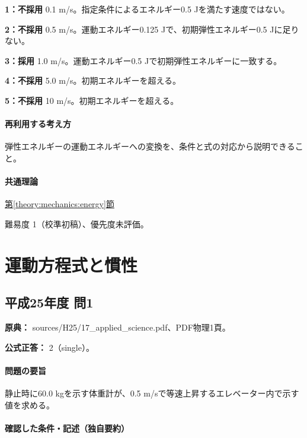 \noindent\textbf{1：不採用} 0.1 m/s。指定条件によるエネルギー0.5 Jを満たす速度ではない。\par

\noindent\textbf{2：不採用} 0.5 m/s。運動エネルギー0.125 Jで、初期弾性エネルギー0.5 Jに足りない。\par

\noindent\textbf{3：採用} 1.0 m/s。運動エネルギー0.5 Jで初期弾性エネルギーに一致する。\par

\noindent\textbf{4：不採用} 5.0 m/s。初期エネルギーを超える。\par

\noindent\textbf{5：不採用} 10 m/s。初期エネルギーを超える。\par

\paragraph{再利用する考え方} 弾性エネルギーの運動エネルギーへの変換を、条件と式の対応から説明できること。

\paragraph{共通理論} \hyperref[theory:mechanics:energy]{第\ref*{theory:mechanics:energy}節}

\par 難易度 1（校準初稿）、優先度未評価。

\section{運動方程式と慣性}

\subsection{平成25年度 問1}
\label{q:h25-reg-applied-01}

\noindent\textbf{原典：} sources/H25/17\_applied\_science.pdf、PDF物理1頁。

\textbf{公式正答：} 2（single）。

\paragraph{問題の要旨} 静止時に60.0 kgを示す体重計が、0.5 m/sで等速上昇するエレベーター内で示す値を求める。

\paragraph{確認した条件・記述（独自要約）}\mbox{}\par

